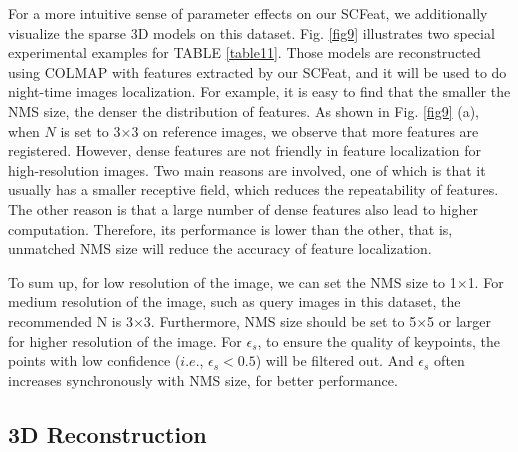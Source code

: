\documentclass[journal]{IEEEtran}
\begin{document}
For a more intuitive sense of parameter effects on our SCFeat, we additionally visualize the sparse 3D models on this dataset.
Fig. \ref{fig9} illustrates two special experimental examples for TABLE \ref{table11}. 
Those models are reconstructed using COLMAP \cite{schoenberger2016sfm,schoenberger2016mvs} with features extracted by our SCFeat, and it will be used to do night-time images localization. 
For example, it is easy to find that the smaller the NMS size, the denser the distribution of features.
As shown in Fig. \ref{fig9} (a), when $N$ is set to 3$\times$3 on reference images, we observe that more features are registered. However, dense features are not friendly in feature localization for high-resolution images. Two main reasons are involved, one of which is that it usually has a smaller receptive field, which reduces the repeatability of features. The other reason is that a large number of dense features also lead to higher computation. Therefore, its performance is lower than the other, that is, unmatched NMS size will reduce the accuracy of feature localization.



To sum up, for low resolution of the image, we can set the NMS size to 1$\times$1. For medium resolution of the image, such as query images in this dataset, the recommended N is 3$\times$3. Furthermore, NMS size should be set to 5$\times$5 or larger for higher resolution of the image. For $\epsilon_s$, to ensure the quality of keypoints, the points with low confidence ($i.e.$, $\epsilon_s < 0.5$) will be filtered out. And $\epsilon_s$ often increases synchronously with NMS size, for better performance.


\subsection{3D Reconstruction}\label{3d}
\end{document}
